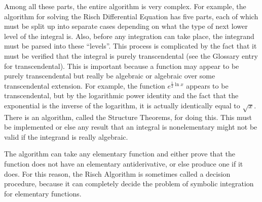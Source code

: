 Among all these parts, the entire algorithm is very complex.  For
example, the algorithm for solving the Risch Differential Equation has
five parts, each of which must be split up into separate cases depending
on what the type of next lower level of the integral is. Also, before
any \gls{integration} can take place, the \gls{integrand} must be parsed
into these ``levels''.  This process is complicated by the fact that it
must be verified that the integral is purely \gls{transcendental} (see
the Glossary entry for \gls{transcendental}).  This is important because
a function may appear to be purely \gls{transcendental} but really be
\gls{algebraic} or \gls{algebraic} over some \gls{transcendental}
extension.  For example, the function $e^{\frac{1}{2}\ln{x}}$ appears to
be transcendental, but by the logarithmic power identity and the fact
that the exponential is the inverse of the logarithm, it is actually
identically equal to $\sqrt{x}$.  There is an algorithm, called the
Structure Theorems, for doing this.  This must be implemented or else
any result that an integral is nonelementary might not be valid if the
\gls{integrand} is really \gls{algebraic}.  

The algorithm can take any elementary function and either prove that the
function does not have an \gls{elementary} antiderivative, or else
produce one if it does.  For this reason, the Risch Algorithm is
sometimes called a decision procedure, because it can completely decide
the problem of symbolic \gls{integration} for elementary functions.  
